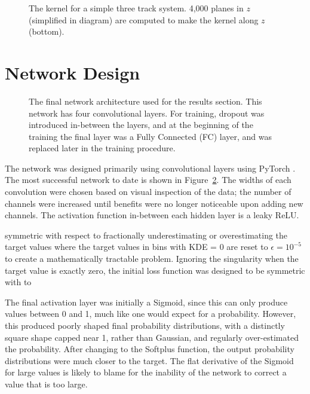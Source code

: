 \documentclass[10pt, paper=a4, UKenglish]{article}
\begin{document}
\begin{figure}[!htb]
	\centering
	
	\caption{The kernel for a simple three track system. 4,000 planes in $z$ (simplified in diagram) are computed to make the kernel along $z$ (bottom).}
	\label{fig:kernel}
\end{figure}

\section{Network Design}

\begin{figure}[!htb]
	\centering
	
	\caption{The final network architecture used for the results section. This network has four convolutional layers. For training, dropout was introduced in-between the layers, and at the beginning of the training the final layer was a Fully Connected (FC) layer, and was replaced later in the training procedure.}
	\label{fig:nnarch}
\end{figure}

The network was designed primarily using convolutional layers using PyTorch \cite{paszke2017automatic}. The most successful network to date is shown in Figure~\ref{fig:nnarch}. The widths of each convolution were chosen based on visual inspection of the data; the number of channels were increased until benefits were no longer noticeable upon adding new channels. The activation function in-between each hidden layer is a leaky ReLU.

symmetric with respect to fractionally underestimating or overestimating the target values where the target values in bins with KDE = 0 are reset to $ \epsilon = 10^{-5} $ to create a mathematically tractable problem.  Ignoring the singularity when the target value is exactly zero, the initial loss function was designed to be symmetric with to

The final activation layer was initially a Sigmoid, since this can only produce values between 0 and 1, much like one would expect for a probability. However, this produced poorly shaped final probability distributions, with a distinctly square shape capped near 1, rather than Gaussian, and regularly over-estimated the probability. After changing to the Softplus function, the output probability distributions were much closer to the target. The flat derivative of the Sigmoid for large values is likely to blame for the inability of the network to correct a value that is too large.
\end{document}
